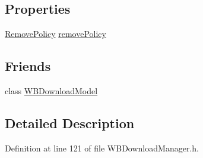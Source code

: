 \subsection*{Properties}
\begin{DoxyCompactItemize}
\item 
\hyperlink{class_w_b_download_manager_ab10eb3722996f2a36c2778da4591f686}{Remove\-Policy} \hyperlink{class_w_b_download_manager_ae5c266e269523e64042724bdf2264898}{remove\-Policy}
\end{DoxyCompactItemize}
\subsection*{Friends}
\begin{DoxyCompactItemize}
\item 
class \hyperlink{class_w_b_download_manager_a40bac202323241472ac8ac200dd00a98}{W\-B\-Download\-Model}
\end{DoxyCompactItemize}


\subsection{Detailed Description}


Definition at line 121 of file W\-B\-Download\-Manager.\-h.




